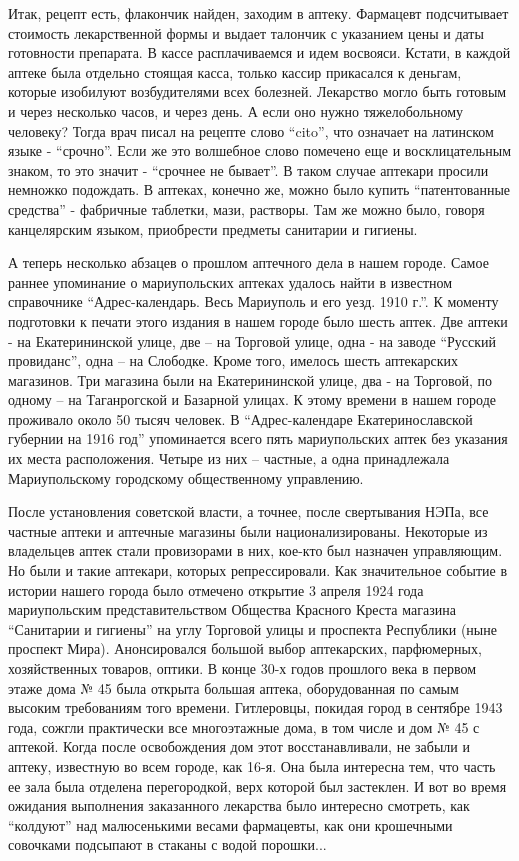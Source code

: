 Итак, рецепт есть, флакончик найден, заходим в аптеку. Фармацевт подсчитывает
стоимость лекарственной формы и выдает талончик с указанием цены и даты
готовности препарата. В кассе расплачиваемся и идем восвояси. Кстати, в каждой
аптеке была отдельно стоящая касса, только кассир прикасался к деньгам, которые
изобилуют возбудителями всех болезней. Лекарство могло быть готовым и через
несколько часов, и через день. А если оно нужно тяжелобольному человеку? Тогда
врач писал на рецепте слово \enquote{cito}, что означает  на латинском языке -
\enquote{срочно}. Если же это волшебное слово помечено еще и восклицательным знаком, то
это значит  - \enquote{срочнее не бывает}. В таком случае аптекари просили  немножко
подождать. В аптеках, конечно же,  можно было купить  \enquote{патентованные средства}
- фабричные таблетки, мази, растворы. Там же можно было, говоря канцелярским
языком, приобрести предметы санитарии и гигиены.

А теперь несколько абзацев о прошлом аптечного дела в нашем городе. Самое
раннее упоминание о мариупольских аптеках удалось найти в известном справочнике
\enquote{Адрес-календарь. Весь Мариуполь и его уезд. 1910 г.}.  К моменту подготовки к
печати  этого издания в нашем городе  было шесть аптек. Две аптеки  - на
Екатерининской улице, две – на Торговой улице, одна - на заводе \enquote{Русский
провиданс}, одна – на Слободке. Кроме  того,  имелось шесть аптекарских
магазинов. Три магазина  были  на Екатерининской улице,  два - на Торговой, по
одному – на Таганрогской  и  Базарной улицах. К этому времени в нашем городе
проживало около 50 тысяч человек. В \enquote{Адрес-календаре Екатеринославской губернии
на 1916 год} упоминается всего пять мариупольских аптек без указания их места
расположения. Четыре из них – частные, а одна принадлежала Мариупольскому
городскому общественному управлению.

После установления советской власти, а точнее, после свертывания НЭПа, все
частные аптеки и аптечные магазины были национализированы. Некоторые из
владельцев аптек стали провизорами в них, кое-кто был назначен управляющим. Но
были и такие аптекари, которых репрессировали. Как значительное событие в
истории нашего города было отмечено открытие 3 апреля 1924 года мариупольским
представительством Общества Красного Креста магазина \enquote{Санитарии и гигиены} на
углу Торговой улицы  и проспекта Республики (ныне проспект Мира). Анонсировался
большой  выбор аптекарских, парфюмерных, хозяйственных товаров, оптики.  В
конце 30-х годов прошлого века в первом этаже дома № 45 была открыта большая
аптека, оборудованная по самым высоким требованиям того времени. Гитлеровцы,
покидая город в сентябре 1943 года, сожгли практически все многоэтажные дома, в
том числе и дом № 45 с аптекой. Когда после освобождения дом этот
восстанавливали, не забыли и аптеку, известную во всем городе, как 16-я. Она
была интересна тем, что часть ее зала была отделена перегородкой, верх которой
был застеклен. И вот во время ожидания выполнения заказанного лекарства было
интересно смотреть, как \enquote{колдуют} над малюсенькими весами фармацевты, как они
крошечными совочками подсыпают в стаканы с водой порошки...

